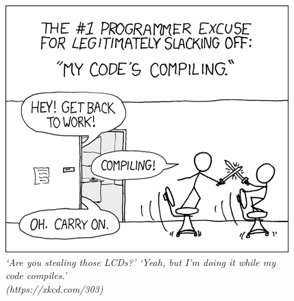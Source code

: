 \vfill

\begin{figure}[h!]
\centering
\includegraphics[scale=.7]{img/xkcd/compiling.png}
\caption*{{\small
    \foreignlanguage{english}{
      \textit{\enquote*{Are you stealing those LCDs?} \enquote*{Yeah, but I'm doing it while my code compiles.}\\\hspace*{1mm}\hfill(https://xkcd.com/303)}
    }
  }
}
\end{figure}
